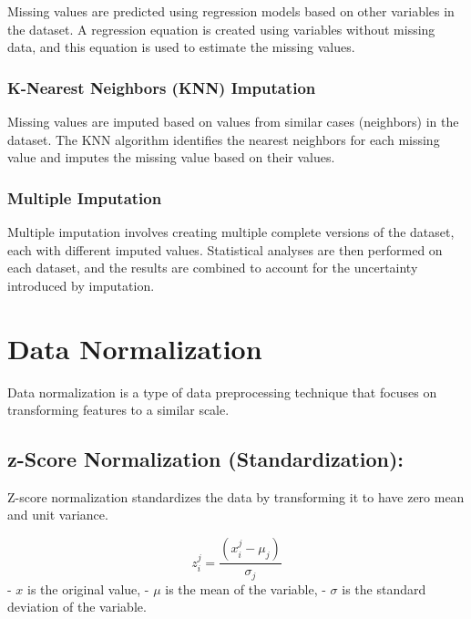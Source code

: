\documentclass[a4paper,conference]{IEEEtran}
\begin{document}
Missing values are predicted using regression models based on other
variables in the dataset. A regression equation is created using
variables without missing data, and this equation is used to estimate
the missing values.

\hypertarget{sec:k-nearest-neighbors-knn-imputation}{%
\subsubsection{K-Nearest Neighbors (KNN)
Imputation}\label{sec:k-nearest-neighbors-knn-imputation}}

Missing values are imputed based on values from similar cases
(neighbors) in the dataset. The KNN algorithm identifies the nearest
neighbors for each missing value and imputes the missing value based on
their values.

\hypertarget{sec:multiple-imputation}{%
\subsubsection{Multiple Imputation}\label{sec:multiple-imputation}}

Multiple imputation involves creating multiple complete versions of the
dataset, each with different imputed values. Statistical analyses are
then performed on each dataset, and the results are combined to account
for the uncertainty introduced by imputation.

\hypertarget{sec:data-normalization}{%
\section{Data Normalization}\label{sec:data-normalization}}

Data normalization is a type of data preprocessing technique that
focuses on transforming features to a similar scale.

\hypertarget{sec:z-score-normalization-standardization}{%
\subsection{z-Score Normalization
(Standardization):}\label{sec:z-score-normalization-standardization}}

Z-score normalization standardizes the data by transforming it to have
zero mean and unit variance.

\[
z^j_{i} = \frac{(x^j_{i}  - \mu_j)}{\sigma_j} 
\] - \(x\) is the original value, - \(\mu\) is the mean of the variable,
- \(\sigma\) is the standard deviation of the variable.
\end{document}
